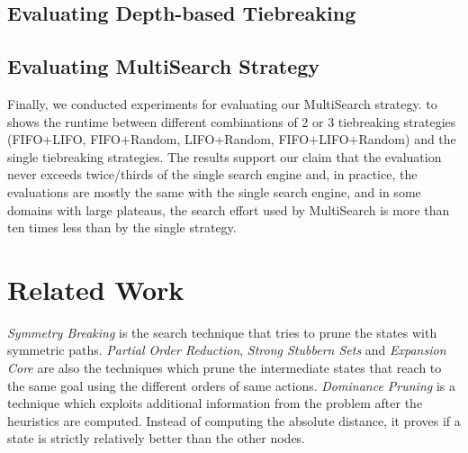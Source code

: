 

\subsection{Evaluating Depth-based Tiebreaking}




\subsection{Evaluating MultiSearch Strategy}

Finally, we conducted experiments for evaluating our MultiSearch strategy.
 to  shows the runtime between different combinations of 2 or 3 tiebreaking strategies (FIFO+LIFO, FIFO+Random, LIFO+Random, FIFO+LIFO+Random) and the single tiebreaking strategies. The results support our claim that the evaluation never exceeds twice/thirds of the single search engine and, in practice, the evaluations are mostly the same with the single search engine, and in some domains with large plateaus, the search effort used by MultiSearch is more than ten times less than by the single strategy.

\begin{figure}[htbp]
 \centering
 \caption{}
 \label{portfolio-ff}
\end{figure}


\section{Related Work}
\label{sec-4}

\emph{Symmetry Breaking} \cite{Fox1998,pochter2011exploiting,domshlak2013symmetry} is the search technique that tries to prune the states with symmetric paths. \emph{Partial Order Reduction}, \emph{Strong Stubbern Sets} and \emph{Expansion Core} are also the techniques which prune the intermediate states that reach to the same goal using the different orders of same actions. \emph{Dominance Pruning} \cite{erol1994} is a technique which exploits additional information from the problem after the heuristics are computed. Instead of computing the absolute distance, it  proves if a state is strictly relatively better than the other nodes.

